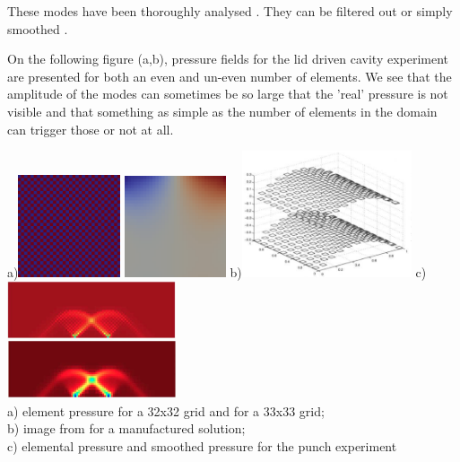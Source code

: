 \documentclass[a4paper]{article}
\begin{document}
These modes have been thoroughly analysed \cite{grsi94,chpc95,sagl81a,sagl81b}.
They can be filtered out \cite{chpc95} or simply smoothed \cite{legs79}.

On the following figure (a,b), pressure fields for the lid driven cavity experiment 
are presented for both an even and un-even number of elements. We see that 
the amplitude of the modes can sometimes be so large that the 'real' pressure is 
not visible and that something as simple as the number of elements in the 
domain can trigger those or not at all.

\begin{center}
a)\includegraphics[width=3cm]{images/checkerboard/p_el}
\includegraphics[width=3cm]{images/checkerboard/p_el_33x33}
b)\includegraphics[width=5cm]{images/checkerboard/press_doneahuerta}
c)\includegraphics[width=5cm]{images/checkerboard/douarpunch}\\
{\small a) element pressure for a 32x32 grid and for a 33x33 grid;\\ 
b) image from \cite[p307]{dohu} for a manufactured solution;\\ 
c) elemental pressure and smoothed pressure for the punch experiment \cite{thfb08}}
\end{center}
\end{document}
